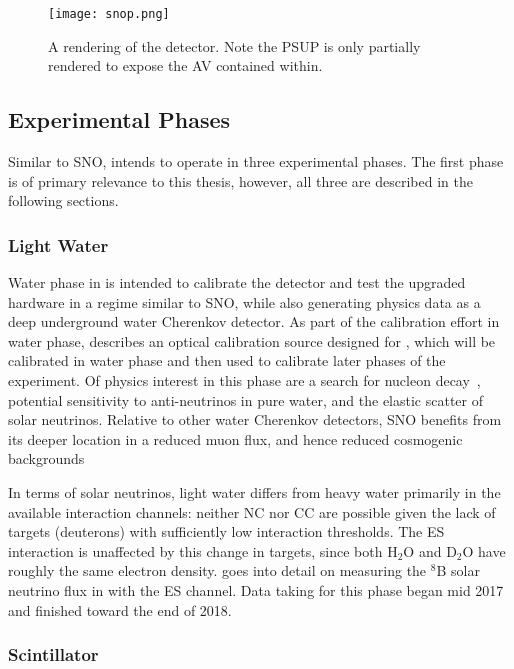 \begin{figure}
\centering
\texttt{[image: snop.png]}
\caption{\label{fig:snop}A rendering of the {\snop} detector. Note the PSUP is only partially rendered to expose the AV contained within.}
\end{figure}

\subsection{Experimental Phases}
Similar to SNO, {\snop} intends to operate in three experimental phases.
The first phase is of primary relevance to this thesis, however, all three are described in the following sections.

\subsubsection{Light Water}
Water phase in {\snop} is intended to calibrate the detector and test the upgraded hardware in a regime similar to SNO, while also generating physics data as a deep underground water Cherenkov detector.
As part of the calibration effort in water phase,  describes an optical calibration source designed for {\snop}, which will be calibrated in water phase and then used to calibrate later phases of the experiment.
Of physics interest in this phase are a search for nucleon decay~\cite{nucleon_decay}, potential sensitivity to anti-neutrinos in pure water, and the elastic scatter of solar neutrinos.
Relative to other water Cherenkov detectors, SNO benefits from its deeper location in a reduced muon flux, and hence reduced cosmogenic backgrounds

In terms of solar neutrinos, light water differs from heavy water primarily in the available interaction channels: neither NC nor CC are possible given the lack of targets (deuterons) with sufficiently low interaction thresholds.
The ES interaction is unaffected by this change in targets, since both H$_2$O and D$_2$O have roughly the same electron density.
 goes into detail on measuring the $^8$B solar neutrino flux in {\snop} with the ES channel.
Data taking for this phase began mid 2017 and finished toward the end of 2018.

\subsubsection{Scintillator}

